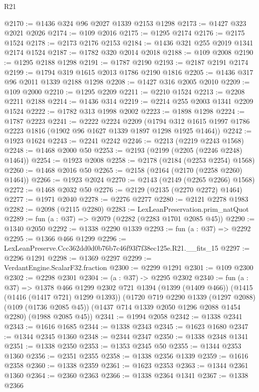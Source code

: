 \begin{lexlean}{R21}
\begin{coremodule}
@2170 := @1436 @324 @96 @2027 @1339 @2153 @1298
@2173 := @1427 @323 @2021 @2026
@2174 := @109 @2016
@2175 := @1295 @2174
@2176 := @2175 @1524
@2178 := @2173 @2176 @2153
@2184 := @1436 @321 @255 @2019 @1341 @2174 @1524
@2187 := @1782 @320 @2014 @2018
@2188 := @109 @2008
@2190 := @1295 @2188 @1298
@2191 := @1787 @2190
@2193 := @2187 @2191 @2174
@2199 := @1794 @319 @1615 @2013 @1786 @2190 @1816
@2205 := @1436 @317 @96 @2011 @1339 @2188 @1298
@2208 := @1427 @316 @2005 @2010
@2209 := @109 @2000
@2210 := @1295 @2209
@2211 := @2210 @1524
@2213 := @2208 @2211 @2188
@2214 := @1436 @314
@2219 := @2214 @255 @2003 @1341 @2209 @1524
@2222 := @1782 @313 @1998 @2002
@2223 := @1898 @1298
@2224 := @1787 @2223
@2241 := @2222
    @2224
    @2209
    (@1794 @312 @1615 @1997 @1786 @2223 @1816 (@1902 @96 @1627 @1339 @1897 @1298 @1925 @1464))
@2242 := @1923 @1624
@2243 := @2241 @2242
@2246 := @2213 (@2219 @2243 @1568)
@2248 := @1468 @2000 @50
@2253 := @2193 (@2199 (@2205 (@2246 @2248) @1464))
@2254 := @1923 @2008
@2258 := @2178 (@2184 (@2253 @2254) @1568)
@2260 := @1468 @2016 @50
@2265 := @2158 (@2164 (@2170 (@2258 @2260) @1464))
@2266 := @1923 @2024
@2270 := @2143 (@2149 (@2265 @2266) @1568)
@2272 := @1468 @2032 @50
@2276 := @2129 (@2135 (@2270 @2272) @1464)
@2277 := @1971 @2040
@2278 := @2276 @2277
@2280 := @2121 @2278 @1983
@2282 := @2098 (@2115 @2280)
@2283 := LexLeanPreservation.prim_natQuot
@2289 := fun (a : @37) => @2079 (@2282 (@2283 @1701 @2085 @45))
@2290 := @1340 @2050
@2292 := @1338 @2290 @1339
@2293 := fun (a : @37) => @2292
@2295 := @1366 @466 @1299
@2296 := LexLeanPreserve.Ccc362dd0d0b76b7c46f93f7f38ec125e.R21.__fits_15
@2297 := @2296 @1291
@2298 := @1369 @2297
@2299 := VerdantEngine.ScalarF32.fraction
@2300 := @2299 @1291
@2301 := @109 @2300
@2302 := @2298 @2301
@2304 := (a : @37) -> @2295 @2302
@2340 := fun (a : @37) =>
  @1378
    @466
    @1299
    @2302
    @721
    @1394
    (@1399 (@1409 @466))
    (@1415 (@1416 (@1417 @721) @1299 @1393))
    (@1720
      @719
      @2290
      @1339
      (@1297 @2088)
      (@109 (@1736 @2085 @45))
      (@1437 @714 @1339 @2050 @1296 @2088 @1454 @2280)
      (@1988 @2085 @45))
@2341 := @1994 @2058
@2342 := @1338 @2341
@2343 := @1616 @1685
@2344 := @1338 @2343
@2345 := @1623 @1680
@2347 := @1344 @2345 @1360
@2348 := @2344 @2347
@2350 := @1338 @2348 @1341
@2351 := @1338 @2350
@2353 := @1353 @2345 @50
@2355 := @1344 @2353 @1360
@2356 := @2351 @2355
@2358 := @1338 @2356 @1339
@2359 := @1616 @2358
@2360 := @1338 @2359
@2361 := @1623 @2353
@2363 := @1344 @2361 @1360
@2364 := @2360 @2363
@2366 := @1338 @2364 @1341
@2367 := @1338 @2366

\end{coremodule}
\end{lexlean}
